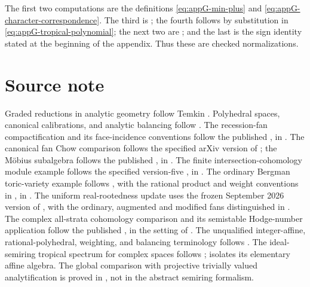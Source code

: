 The first two computations are the definitions
\eqref{eq:appG-min-plus} and \eqref{eq:appG-character-correspondence}.
The third is ; the fourth follows by
substitution in \eqref{eq:appG-tropical-polynomial}; the next two are
; and the last is the sign
identity stated at the beginning of the appendix.  Thus these are checked
normalizations.

\section*{Source note}
\label{sec:appG-source-note}

Graded reductions in analytic geometry follow Temkin
\cite{Temkin2004}.
Polyhedral spaces, canonical calibrations, and analytic balancing follow
\cite{CLD25}.
The recession-fan compactification and its face-incidence conventions
follow the published \cite{KSW25Compactification}, in
.
The canonical fan Chow comparison follows the specified arXiv version
of \cite{AP24FanChow}; the M\"obius subalgebra follows the published
\cite{BHM22AugmentedChow}, in .
The finite intersection-cohomology module example follows the specified
version-five \cite{BHM26SingularHodge}, in
.
The ordinary Bergman toric-variety example follows
\cite{Binder26UniformCohomology,Binder26SingularCohomology}, with
the rational product and weight conventions in
\cite{FranzFu24Naturality,Weber04ToricWeights}, in
.
The uniform real-rootedness update uses the frozen September 2026
version of \cite{BinderVecchi26AugmentedCohomology}, with the
ordinary, augmented and modified fans distinguished in
.
The complex all-strata cohomology comparison and its semistable
Hodge-number application follow the published
\cite{AAPS25Cohomologically}, in the setting of
.
The unqualified integer-affine, rational-polyhedral, weighting, and
balancing terminology follows
\cite[\S\S1.3, 2.1 and 4.2]{MR18Tropical}.
The ideal-semiring tropical spectrum for complex spaces follows
\cite{MP24};  isolates its elementary
affine algebra.
The global comparison with projective trivially valued analytification is
proved in , not in the abstract
semiring formalism.
